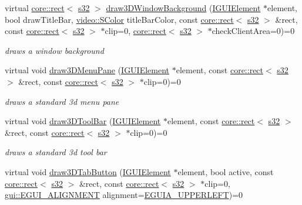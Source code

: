 \begin{DoxyCompactItemize}
virtual \hyperlink{classirr_1_1core_1_1rect}{core\+::rect}$<$ \hyperlink{namespaceirr_ac66849b7a6ed16e30ebede579f9b47c6}{s32} $>$ \hyperlink{classirr_1_1gui_1_1IGUISkin_a615d368dc8290d7f2a635698e697a53f}{draw3\+D\+Window\+Background} (\hyperlink{classirr_1_1gui_1_1IGUIElement}{I\+G\+U\+I\+Element} $\ast$element, bool draw\+Title\+Bar, \hyperlink{classirr_1_1video_1_1SColor}{video\+::\+S\+Color} title\+Bar\+Color, const \hyperlink{classirr_1_1core_1_1rect}{core\+::rect}$<$ \hyperlink{namespaceirr_ac66849b7a6ed16e30ebede579f9b47c6}{s32} $>$ \&rect, const \hyperlink{classirr_1_1core_1_1rect}{core\+::rect}$<$ \hyperlink{namespaceirr_ac66849b7a6ed16e30ebede579f9b47c6}{s32} $>$ $\ast$clip=0, \hyperlink{classirr_1_1core_1_1rect}{core\+::rect}$<$ \hyperlink{namespaceirr_ac66849b7a6ed16e30ebede579f9b47c6}{s32} $>$ $\ast$check\+Client\+Area=0)=0
\begin{DoxyCompactList}\small\item\em draws a window background \end{DoxyCompactList}\item 
virtual void \hyperlink{classirr_1_1gui_1_1IGUISkin_a1fce02fb3795fc5e71e775a6396fe0eb}{draw3\+D\+Menu\+Pane} (\hyperlink{classirr_1_1gui_1_1IGUIElement}{I\+G\+U\+I\+Element} $\ast$element, const \hyperlink{classirr_1_1core_1_1rect}{core\+::rect}$<$ \hyperlink{namespaceirr_ac66849b7a6ed16e30ebede579f9b47c6}{s32} $>$ \&rect, const \hyperlink{classirr_1_1core_1_1rect}{core\+::rect}$<$ \hyperlink{namespaceirr_ac66849b7a6ed16e30ebede579f9b47c6}{s32} $>$ $\ast$clip=0)=0
\begin{DoxyCompactList}\small\item\em draws a standard 3d menu pane \end{DoxyCompactList}\item 
virtual void \hyperlink{classirr_1_1gui_1_1IGUISkin_a8510de5c6bcd0dae99b9b77ac39aba6b}{draw3\+D\+Tool\+Bar} (\hyperlink{classirr_1_1gui_1_1IGUIElement}{I\+G\+U\+I\+Element} $\ast$element, const \hyperlink{classirr_1_1core_1_1rect}{core\+::rect}$<$ \hyperlink{namespaceirr_ac66849b7a6ed16e30ebede579f9b47c6}{s32} $>$ \&rect, const \hyperlink{classirr_1_1core_1_1rect}{core\+::rect}$<$ \hyperlink{namespaceirr_ac66849b7a6ed16e30ebede579f9b47c6}{s32} $>$ $\ast$clip=0)=0
\begin{DoxyCompactList}\small\item\em draws a standard 3d tool bar \end{DoxyCompactList}\item 
virtual void \hyperlink{classirr_1_1gui_1_1IGUISkin_a9e7027309a52d17554be984554134426}{draw3\+D\+Tab\+Button} (\hyperlink{classirr_1_1gui_1_1IGUIElement}{I\+G\+U\+I\+Element} $\ast$element, bool active, const \hyperlink{classirr_1_1core_1_1rect}{core\+::rect}$<$ \hyperlink{namespaceirr_ac66849b7a6ed16e30ebede579f9b47c6}{s32} $>$ \&rect, const \hyperlink{classirr_1_1core_1_1rect}{core\+::rect}$<$ \hyperlink{namespaceirr_ac66849b7a6ed16e30ebede579f9b47c6}{s32} $>$ $\ast$clip=0, \hyperlink{namespaceirr_1_1gui_a19eb5fb40e67f108cb16aba922ddaa2d}{gui\+::\+E\+G\+U\+I\+\_\+\+A\+L\+I\+G\+N\+M\+E\+NT} alignment=\hyperlink{namespaceirr_1_1gui_a19eb5fb40e67f108cb16aba922ddaa2da29a8bc6d2531cca02458ca8809aa2b75}{E\+G\+U\+I\+A\+\_\+\+U\+P\+P\+E\+R\+L\+E\+FT})=0

\end{DoxyCompactItemize}
